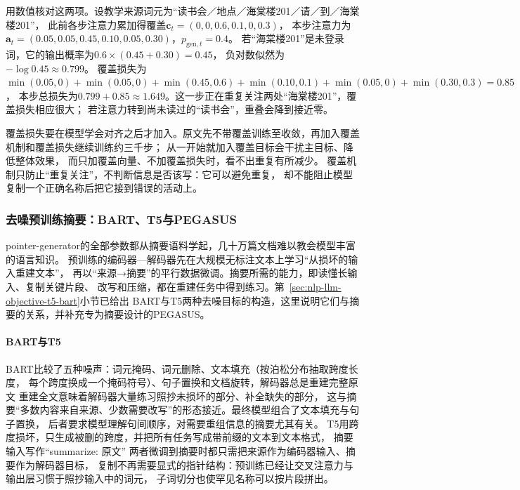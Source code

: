 用数值核对这两项。设教学来源词元为“读书会／地点／海棠楼201／请／到／海棠楼201”，
此前各步注意力累加得覆盖$\bm c_t=(0,0,0.6,0.1,0,0.3)$，
本步注意力为$\bm a_t=(0.05,0.05,0.45,0.10,0.05,0.30)$，$p_{\mathrm{gen},t}=0.4$。
若“海棠楼201”是未登录词，它的输出概率为$0.6\times(0.45+0.30)=0.45$，
负对数似然为$-\log0.45\approx0.799$。
覆盖损失为$\min(0.05,0)+\min(0.05,0)+\min(0.45,0.6)+\min(0.10,0.1)+\min(0.05,0)+\min(0.30,0.3)=0.85$，
本步总损失为$0.799+0.85\approx1.649$。这一步正在重复关注两处“海棠楼201”，覆盖损失相应很大；
若注意力转到尚未读过的“读书会”，重叠会降到接近零。

覆盖损失要在模型学会对齐之后才加入。原文先不带覆盖训练至收敛，再加入覆盖机制和覆盖损失继续训练约三千步；
从一开始就加入覆盖目标会干扰主目标、降低整体效果，
而只加覆盖向量、不加覆盖损失时，看不出重复有所减少。
覆盖机制只防止“重复关注”，不判断信息是否该写：它可以避免重复，
却不能阻止模型复制一个正确名称后把它接到错误的活动上。

\subsubsection{去噪预训练摘要：BART、T5与PEGASUS}
\label{sec:nlp-generation-conditional-summary}

pointer-generator的全部参数都从摘要语料学起，几十万篇文档难以教会模型丰富的语言知识。
预训练的编码器—解码器先在大规模无标注文本上学习“从损坏的输入重建文本”，
再以“来源→摘要”的平行数据微调。摘要所需的能力，即读懂长输入、复制关键片段、
改写和压缩，都在重建任务中得到练习。第~\ref{sec:nlp-llm-objective-t5-bart}小节已给出
BART与T5两种去噪目标的构造，这里说明它们与摘要的关系，并补充专为摘要设计的PEGASUS。

\paragraph{BART与T5}
BART比较了五种噪声：词元掩码、词元删除、文本填充（按泊松分布抽取跨度长度，
每个跨度换成一个掩码符号）、句子置换和文档旋转，解码器总是重建完整原文
重建全文意味着解码器大量练习照抄未损坏的部分、补全缺失的部分，
这与摘要“多数内容来自来源、少数需要改写”的形态接近。最终模型组合了文本填充与句子置换，
后者要求模型理解句间顺序，对需要重组信息的摘要尤其有关。
T5用跨度损坏，只生成被删的跨度，并把所有任务写成带前缀的文本到文本格式，
摘要输入写作“summarize: 原文”
两者微调到摘要时都只需把来源作为编码器输入、摘要作为解码器目标，
复制不再需要显式的指针结构：预训练已经让交叉注意力与输出层习惯于照抄输入中的词元，
子词切分也使罕见名称可以按片段拼出。

